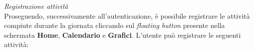 \documentclass{article}
\begin{document}
    \begin{center}
        \begin{figure}[H]
            \centering
        \end{figure}
    \end{center}
    \textit{Registrazione attività} \vspace*{7pt}\\
    Proseguendo, successivamente all'autenticazione, è possibile registrare le attività compiute durante la giornata cliccando sul \textit{floating button} presente nella schermata \textbf{Home}, \textbf{Calendario} e \textbf{Grafici}. L'utente può registrare le seguenti attività:
\end{document}
